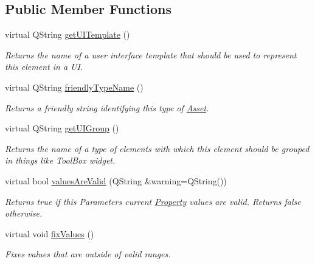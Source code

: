 \subsection*{Public Member Functions}
\begin{DoxyCompactItemize}
\item 
\hypertarget{class_picto_1_1_parameter_a1f72bd3b6d881ef062db768ada609302}{virtual Q\-String \hyperlink{class_picto_1_1_parameter_a1f72bd3b6d881ef062db768ada609302}{get\-U\-I\-Template} ()}\label{class_picto_1_1_parameter_a1f72bd3b6d881ef062db768ada609302}

\begin{DoxyCompactList}\small\item\em Returns the name of a user interface template that should be used to represent this element in a U\-I. \end{DoxyCompactList}\item 
virtual Q\-String \hyperlink{class_picto_1_1_parameter_a379ef70ba283fa7c49f2548dad432dbb}{friendly\-Type\-Name} ()
\begin{DoxyCompactList}\small\item\em Returns a friendly string identifying this type of \hyperlink{class_picto_1_1_asset}{Asset}. \end{DoxyCompactList}\item 
\hypertarget{class_picto_1_1_parameter_abc3fd80bab8d8086fedf29eb50e733f3}{virtual Q\-String \hyperlink{class_picto_1_1_parameter_abc3fd80bab8d8086fedf29eb50e733f3}{get\-U\-I\-Group} ()}\label{class_picto_1_1_parameter_abc3fd80bab8d8086fedf29eb50e733f3}

\begin{DoxyCompactList}\small\item\em Returns the name of a type of elements with which this element should be grouped in things like Tool\-Box widget. \end{DoxyCompactList}\item 
virtual bool \hyperlink{class_picto_1_1_parameter_a3443808da4c3edf26f2c3c3772d95b10}{values\-Are\-Valid} (Q\-String \&warning=Q\-String())
\begin{DoxyCompactList}\small\item\em Returns true if this Parameters current \hyperlink{class_picto_1_1_property}{Property} values are valid. Returns false otherwise. \end{DoxyCompactList}\item 
virtual void \hyperlink{class_picto_1_1_parameter_a219dc74f193fc0f25e813275a945b822}{fix\-Values} ()
\begin{DoxyCompactList}\small\item\em Fixes values that are outside of valid ranges. \end{DoxyCompactList}\end{DoxyCompactItemize}
